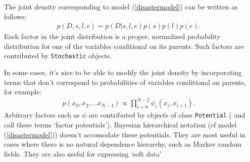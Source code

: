 % 

The joint density corresponding to model (\ref{disastermodel}) can be written as follows:
\begin{eqnarray*}
    p(D,s,l,e) = p(D|s,l,e) p(s) p(l) p(e).
\end{eqnarray*}
Each factor in the joint distribution is a proper, normalized probability distribution for one of the variables conditional on its parents. Such factors are contributed by \texttt{Stochastic} objects.

In some cases, it's nice to be able to modify the joint density by incorporating terms that don't correspond to probabilities of variables conditional on parents, for example:
\begin{eqnarray*}
    p(x_0, x_2, \ldots x_{N-1}) \propto \prod_{i=0}^{N-2} \psi_i(x_i, x_{i+1}).
\end{eqnarray*}
Arbitrary factors such as $\psi$ are contributed by objects of class \texttt{Potential} (\cite{dawidmarkov} and \cite{jordangraphical} call these terms `factor potentials'). Bayesian hierarchical notation (cf model (\ref{disastermodel})) doesn't accomodate these potentials. They are most useful in cases where there is no natural dependence hierarchy, such as Markov random fields. They are also useful for expressing `soft data' \cite{christakos} 

